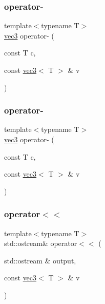 \subsubsection{\texorpdfstring{operator-\/}{operator-}\hspace{0.1cm}{\footnotesize\ttfamily [2/3]}}
{\footnotesize\ttfamily template$<$typename T$>$ \\
\mbox{\hyperlink{struct_space_h_1_1vec3}{vec3}} operator-\/ (\begin{DoxyParamCaption}\item[{const T}]{c,  }\item[{const \mbox{\hyperlink{struct_space_h_1_1vec3}{vec3}}$<$ T $>$ \&}]{v }\end{DoxyParamCaption})\hspace{0.3cm}{\ttfamily [friend]}}

\mbox{\label{struct_space_h_1_1vec3_a6252e85a538cca25b99107166be778b1}} 
\subsubsection{\texorpdfstring{operator-\/}{operator-}\hspace{0.1cm}{\footnotesize\ttfamily [3/3]}}
{\footnotesize\ttfamily template$<$typename T$>$ \\
\mbox{\hyperlink{struct_space_h_1_1vec3}{vec3}} operator-\/ (\begin{DoxyParamCaption}\item[{const T}]{c,  }\item[{const \mbox{\hyperlink{struct_space_h_1_1vec3}{vec3}}$<$ T $>$ \&}]{v }\end{DoxyParamCaption})\hspace{0.3cm}{\ttfamily [friend]}}

\mbox{\label{struct_space_h_1_1vec3_af5e1bcad9d3d484d6f4e6b3f8949f5cf}} 
\subsubsection{\texorpdfstring{operator$<$$<$}{operator<<}\hspace{0.1cm}{\footnotesize\ttfamily [1/4]}}
{\footnotesize\ttfamily template$<$typename T$>$ \\
std\+::ostream\& operator$<$$<$ (\begin{DoxyParamCaption}\item[{std\+::ostream \&}]{output,  }\item[{const \mbox{\hyperlink{struct_space_h_1_1vec3}{vec3}}$<$ T $>$ \&}]{v }\end{DoxyParamCaption})\hspace{0.3cm}{\ttfamily [friend]}}



